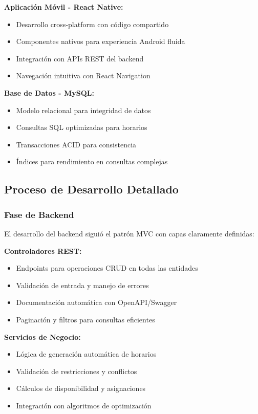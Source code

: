 \textbf{Aplicación Móvil - React Native:}
\begin{itemize}
\item Desarrollo cross-platform con código compartido
\item Componentes nativos para experiencia Android fluida
\item Integración con APIs REST del backend
\item Navegación intuitiva con React Navigation
\end{itemize}

\textbf{Base de Datos - MySQL:}
\begin{itemize}
\item Modelo relacional para integridad de datos
\item Consultas SQL optimizadas para horarios
\item Transacciones ACID para consistencia
\item Índices para rendimiento en consultas complejas
\end{itemize}

\subsection{Proceso de Desarrollo Detallado}

\subsubsection{Fase de Backend}

El desarrollo del backend siguió el patrón MVC con capas claramente definidas:

\textbf{Controladores REST:}
\begin{itemize}
\item Endpoints para operaciones CRUD en todas las entidades
\item Validación de entrada y manejo de errores
\item Documentación automática con OpenAPI/Swagger
\item Paginación y filtros para consultas eficientes
\end{itemize}

\textbf{Servicios de Negocio:}
\begin{itemize}
\item Lógica de generación automática de horarios
\item Validación de restricciones y conflictos
\item Cálculos de disponibilidad y asignaciones
\item Integración con algoritmos de optimización
\end{itemize}


